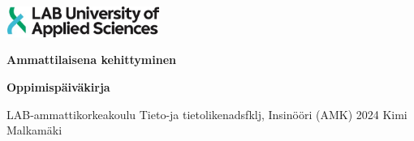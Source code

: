 \documentclass[11pt,a4paper,titlepage,oneside]{article}
\begin{document}
\pagestyle{empty}



\includegraphics[width=5cm,height=1cm]{./src/labimg.jpg}

\vspace{86mm}
\huge
\textbf{Ammattilaisena kehittyminen}
\newline

\large

\vspace{5mm}
\textbf{Oppimispäiväkirja}
\normalsize

\vspace{90mm}

LAB-ammattikorkeakoulu \newline
\vspace{2mm}
Tieto-ja tietolikenadsfklj, Insinööri (AMK) \newline
\vspace{2mm}
2024 \newline
\vspace{2mm}
Kimi Malkamäki

\newpage
\end{document}
